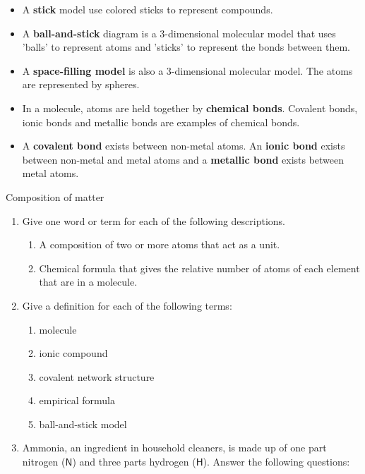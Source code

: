 \begin{enumerate}[noitemsep, label=\textbf{\arabic*}. ]
\begin{itemize}[noitemsep]
\item A \textbf{stick} model use colored sticks to represent compounds.
\label{m38120*uid75}\item A \textbf{ball-and-stick} diagram is a 3-dimensional molecular model that uses 'balls' to represent atoms and 'sticks' to represent the bonds between them.
\label{m38120*uid76}\item A \textbf{space-filling model} is also a 3-dimensional molecular model. The atoms are represented by spheres.
\label{m38120*uid77}\item In a molecule, atoms are held together by \textbf{chemical bonds}. Covalent bonds, ionic bonds and metallic bonds are examples of chemical bonds.
\label{m38120*uid78}\item A \textbf{covalent bond} exists between non-metal atoms. An \textbf{ionic bond} exists between non-metal and metal atoms and a \textbf{metallic bond} exists between metal atoms.
\end{itemize}
\label{m38120*secfhsst!!!underscore!!!id497}
            \begin{eocexercises}{Composition of matter}
            \nopagebreak
            \label{m38120*id311490}\begin{enumerate}[noitemsep, label=\textbf{\arabic*}. ] 
            \label{m38120*uid87}\item Give one word or term for each of the following 
descriptions.
\label{m38120*id34411506}\begin{enumerate}[noitemsep, label=\textbf{\alph*}. ] 
            \label{m38120*uid90}\item A composition of two or more atoms that act as a unit.
\label{m38120*uid9221}\item Chemical formula that gives the relative number of atoms 
of each element that are in a molecule.
\end{enumerate}
\label{m38120*uid227}\item Give a definition for each of the following terms: 
\label{m38120*id311506}\begin{enumerate}[noitemsep, label=\textbf{\alph*}. ] 
            \label{m38120*uid930}\item molecule
\label{m38120*uid91}\item ionic compound
\item covalent network structure
\item empirical formula
\item ball-and-stick model\end{enumerate}
\label{m38120*uid92}\item Ammonia, an ingredient in household cleaners, is made up of one part nitrogen ($\mathsf{N}$) and three parts hydrogen ($\mathsf{H}$). Answer the following questions:

\end{enumerate}
\end{eocexercises}
\end{enumerate}

